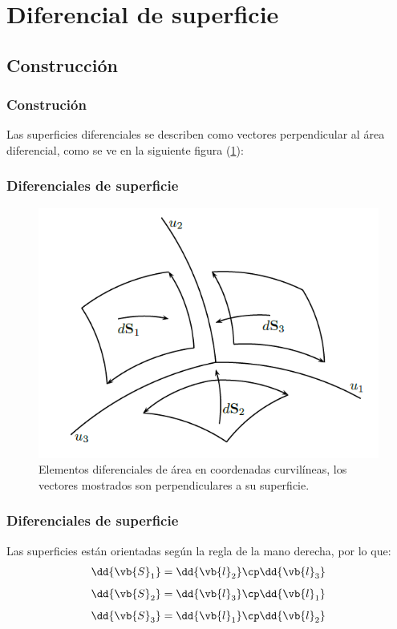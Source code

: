 \section{Diferencial de superficie}
\subsection{Construcción}
\begin{frame}
\frametitle{Construción}
Las superficies diferenciales se describen como vectores perpendicular al área diferencial, como se ve en la siguiente figura (\ref{fig:figura_diferenciales_superficie}):
\end{frame}
\begin{frame}
\frametitle{Diferenciales de superficie}
\begin{figure}[h!]
    \centering
    \includegraphics[scale=0.5]{Imagenes/Diferenciales_Superficie_01.png}
    \caption{Elementos diferenciales de área en coordenadas curvilíneas, los vectores mostrados son perpendiculares a su superficie.}
    \label{fig:figura_diferenciales_superficie}
\end{figure}
\end{frame}
\begin{frame}
\frametitle{Diferenciales de superficie}
Las superficies están orientadas según la regla de la mano derecha, por lo que:
\begin{align*}
\dd{\vb{S}_{1}} &= \dd{\vb{l}_{2}} \cp \dd{\vb{l}_{3}} \\[0.5em] 
\dd{\vb{S}_{2}} &= \dd{\vb{l}_{3}} \cp \dd{\vb{l}_{1}} \\[0.5em]
\dd{\vb{S}_{3}} &= \dd{\vb{l}_{1}} \cp \dd{\vb{l}_{2}}
\end{align*}
\end{frame}
